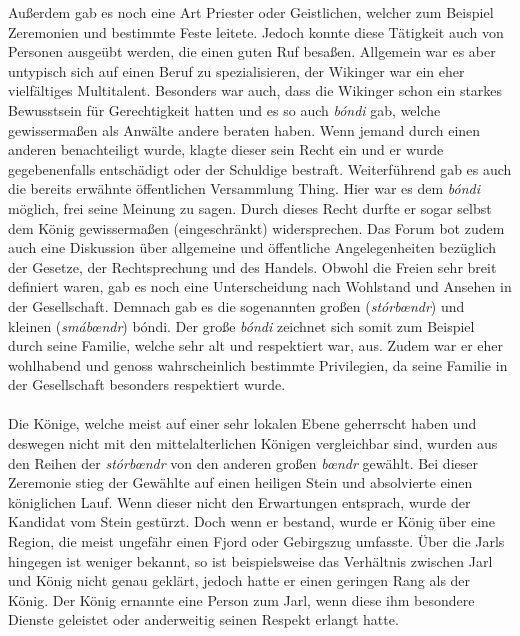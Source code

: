\documentclass[12pt,a4paper,ngerman,openany]{book}
\newcommand{\erklaer}[2]{\leavevmode\marginpar{\footnotesize \textbf{\textit{#1:}}\\#2}\ignorespaces \textit{#1}} %
\begin{document}
Außerdem gab es noch eine Art \glqq Priester\grqq{} oder Geistlichen, welcher zum Beispiel Zeremonien und bestimmte Feste leitete. Jedoch konnte diese Tätigkeit auch von Personen ausgeübt werden, die einen guten Ruf besaßen.
Allgemein war es aber untypisch sich auf einen Beruf zu spezialisieren, der Wikinger war ein eher vielfältiges Multitalent.
Besonders war auch, dass die Wikinger schon ein starkes Bewusstsein für Gerechtigkeit hatten und es so auch \textit{bóndi} gab, welche gewissermaßen als Anwälte andere beraten haben. Wenn jemand durch einen anderen benachteiligt wurde, klagte dieser sein Recht ein und er wurde gegebenenfalls entschädigt oder der Schuldige bestraft. Weiterführend gab es auch die bereits erwähnte öffentlichen Versammlung \glqq Thing\grqq{}. Hier war es dem \textit{bóndi} möglich, frei seine Meinung zu sagen. Durch dieses Recht durfte er sogar selbst dem König gewissermaßen (eingeschränkt) widersprechen. Das Forum bot zudem auch eine Diskussion über allgemeine und öffentliche Angelegenheiten bezüglich der Gesetze, der Rechtsprechung und des Handels.
Obwohl die Freien sehr breit definiert waren, gab es noch eine Unterscheidung nach Wohlstand und Ansehen in der Gesellschaft. Demnach gab es die sogenannten großen (\textit{stórbœndr}) und kleinen (\textit{smábœndr}) bóndi.
Der große \textit{bóndi} zeichnet sich somit zum Beispiel durch seine Familie, welche sehr alt und respektiert war, aus. Zudem war er eher wohlhabend und genoss wahrscheinlich bestimmte Privilegien, da seine Familie in der Gesellschaft besonders respektiert wurde.\\\\
Die Könige, welche meist auf einer sehr lokalen Ebene geherrscht haben und deswegen nicht mit den mittelalterlichen Königen vergleichbar sind, wurden aus den Reihen der \textit{stórbœndr} von den anderen \glqq großen\grqq{} \erklaer{bœndr}{Plural von \textit{bóndi}.} gewählt. Bei dieser Zeremonie stieg der Gewählte auf einen heiligen Stein und absolvierte einen königlichen Lauf. Wenn dieser nicht den Erwartungen entsprach, wurde der Kandidat vom Stein gestürzt. Doch wenn er bestand, wurde er König über eine Region, die meist ungefähr einen Fjord oder Gebirgszug umfasste.
Über die Jarls hingegen ist weniger bekannt, so ist beispielsweise das Verhältnis zwischen Jarl und König nicht genau geklärt, jedoch hatte er einen geringen Rang als der König. Der König ernannte eine Person zum Jarl, wenn diese ihm besondere Dienste geleistet oder anderweitig seinen Respekt erlangt hatte.

\vspace{0.66cm}
\end{document}
